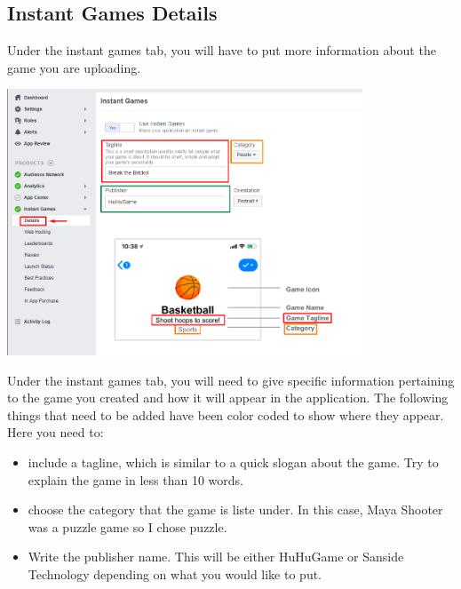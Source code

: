 \documentclass{article}
\begin{document}
\subsection{Instant Games Details}
Under the instant games tab, you will have to put more information about the game you are uploading.

\begin{center}
\includegraphics[width=400px]{images/instantdetails1.png}
\end{center}

Under the instant games tab, you will need to give specific information pertaining to the game you created and how it will appear in the application. The following things that need to be added have been color coded to show where they appear. Here you need to:
\begin{itemize}
\item include a tagline, which is similar to a quick slogan about the game. Try to explain the game in less than 10 words. 
\item choose the category that the game is liste under. In this case, Maya Shooter was a puzzle game so I chose puzzle.
\item Write the publisher name. This will be either HuHuGame or Sanside Technology depending on what you would like to put.
\end{itemize}
\end{document}
